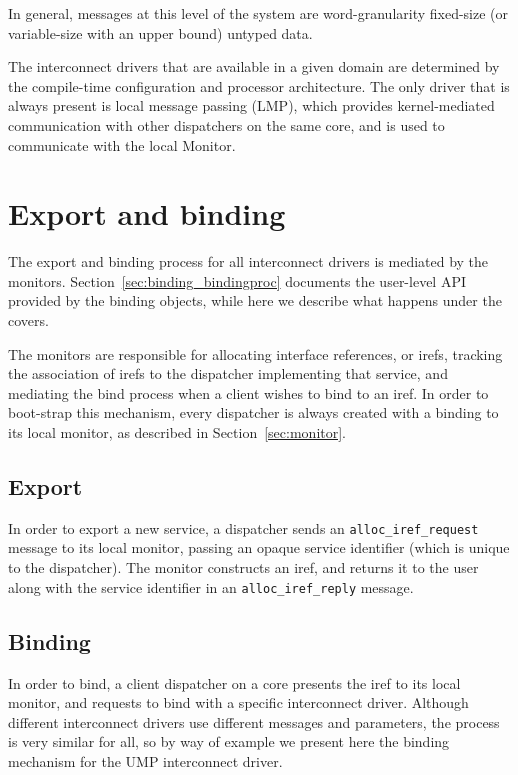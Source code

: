 \documentclass[a4paper,twoside]{report} %
\begin{document}
In general, messages at this level of the system are word-granularity
fixed-size (or variable-size with an upper bound) untyped data.

The interconnect drivers that are available in a given domain are determined by
the compile-time configuration and processor architecture. The only driver
that is always present is local message passing (LMP), which provides
kernel-mediated communication with other dispatchers on the same core,
and is used to communicate with the local Monitor.

\section{Export and binding}
\label{sec:binding}

The export and binding process for all interconnect drivers is mediated by
the monitors. Section~\ref{sec:binding_bindingproc} documents the user-level
API provided by the binding objects, while here we describe what happens under
the covers.

The monitors are responsible for allocating interface references, or irefs,
tracking the association of irefs to the dispatcher implementing that service,
and mediating the bind process when a client wishes to bind to an iref.
In order to boot-strap this mechanism, every dispatcher is always created
with a binding to its local monitor, as described in Section~\ref{sec:monitor}.

\subsection{Export}

In order to export a new service, a dispatcher sends an
\lstinline+alloc_iref_request+ message to its local monitor, passing an opaque
service identifier (which is unique to the dispatcher). The monitor constructs
an iref, and returns it to the user along with the service identifier in an
\lstinline+alloc_iref_reply+ message.

\subsection{Binding}

In order to bind, a client dispatcher on a core presents the iref to its local
monitor, and requests to bind with a specific interconnect driver. Although
different interconnect drivers use different messages and parameters, the
process is very similar for all, so by way of example we present here
the binding mechanism for the UMP interconnect driver.
\end{document}
